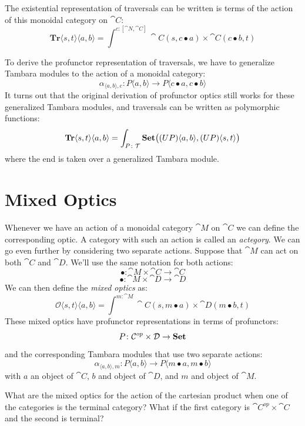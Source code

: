 \documentclass[DaoFP]{subfiles}
\begin{document}
The existential representation of traversals can be written is terms of the action of this monoidal category on $\cat C$:
\[ \mathbf{Tr} \langle s, t\rangle \langle a, b \rangle = \int^{c \colon [\cat N, \cat C]} \cat C (s, c \bullet a) \times \cat C (c \bullet b, t) \]

To derive the profunctor representation of traversals, we have to generalize Tambara modules to the action of a monoidal category:
\[ \alpha_{\langle a, b\rangle, c} \colon P \langle a, b \rangle \to P \langle c \bullet a, c \bullet b \rangle \]
It turns out that the original derivation of profunctor optics still works for these generalized Tambara modules, and traversals can be written as polymorphic functions:
\[  \mathbf{Tr}\langle s, t \rangle \langle a, b \rangle 
 =\int_{P \colon \mathcal{T}} \mathbf{Set} \big((U P) \langle a, b\rangle, (U P) \langle s, t\rangle \big) \]
where the end is taken over a generalized Tambara module.

\section{Mixed Optics}

Whenever we have an action of a monoidal category $\cat M$ on $\cat C$ we can define the corresponding optic. A category with such an action is called an \emph{actegory}. We can go even further by considering two separate actions. Suppose that $\cat M$ can act on both $\cat C$ and $\cat D$. We'll use the same notation for both actions:
\[ \bullet \colon \cat M \times \cat C \to \cat C \]
\[ \bullet \colon \cat M \times \cat D \to \cat D \]
We can then define the \emph{mixed optics} as:
\[ \mathcal{O} \langle s, t \rangle \langle a, b \rangle = \int^{m \colon \cat M} \cat C(s, m \bullet a) \times \cat D(m \bullet b, t) \]
These mixed optics have profunctor representations in terms of profunctors:
\[ P \colon \mathcal{C} ^{op} \times \mathcal{D} \to \mathbf{Set} \]
and the corresponding Tambara modules that use two separate actions:
\[ \alpha_{\langle a, b\rangle, m} \colon P \langle a, b \rangle \to P \langle m \bullet a, m \bullet b \rangle \]
with $a$ an object of $\cat C$, $b$ and object of $\cat D$, and $m$ and object of $\cat M$.

\begin{exercise}
What are the mixed optics for the action of the cartesian product when one of the categories is the terminal category? What if the first category is $\cat C^{op} \times \cat C$ and the second is terminal?
\end{exercise}
\end{document}
